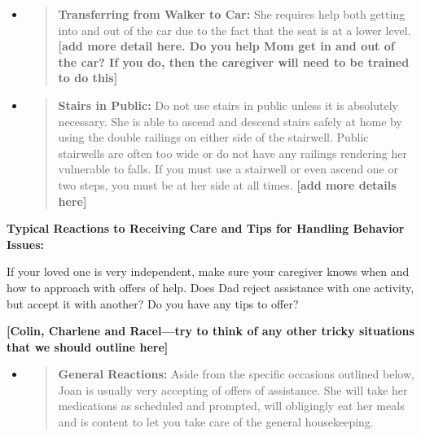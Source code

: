 \documentclass[]{article}
\begin{document}
\begin{itemize}
\item
  \begin{quote}
  \textbf{Transferring from Walker to Car:} She requires help both
  getting into and out of the car due to the fact that the seat is at a
  lower level. \textbf{{[}add more detail here. Do you help Mom get in
  and out of the car? If you do, then the caregiver will need to be
  trained to do this{]}}
  \end{quote}
\end{itemize}

\begin{itemize}
\item
  \begin{quote}
  \textbf{Stairs in Public:} Do not use stairs in public unless it is
  absolutely necessary. She is able to ascend and descend stairs safely
  at home by using the double railings on either side of the stairwell.
  Public stairwells are often too wide or do not have any railings
  rendering her vulnerable to falls. If you must use a stairwell or even
  ascend one or two steps, you must be at her side at all times.
  \textbf{{[}add more details here{]}}
  \end{quote}
\end{itemize}

\textbf{Typical Reactions to Receiving Care and Tips for Handling
Behavior Issues:}

If your loved one is very independent, make sure your caregiver knows
when and how to approach with offers of help. Does Dad reject assistance
with one activity, but accept it with another? Do you have any tips to
offer?

\textbf{{[}Colin, Charlene and Racel---try to think of any other tricky
situations that we should outline here{]}}

\begin{itemize}
\item
  \begin{quote}
  \textbf{General Reactions:} Aside from the specific occasions outlined
  below, Joan is usually very accepting of offers of assistance. She
  will take her medications as scheduled and prompted, will obligingly
  eat her meals and is content to let you take care of the general
  housekeeping.
  \end{quote}
\end{itemize}
\end{document}

